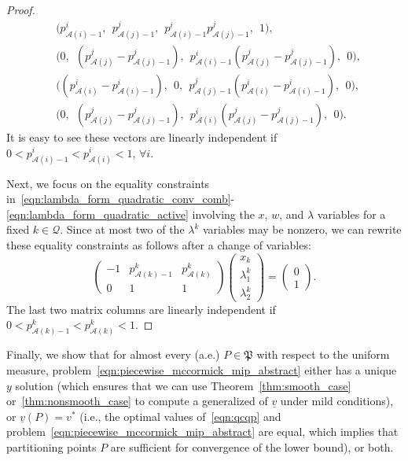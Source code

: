 \documentclass{article}
\begin{document}
\begin{proof}
\begin{align*}
&\bigl(p^i_{\mathcal{A}(i)-1}, \:\: p^j_{\mathcal{A}(j)-1}, \:\: p^i_{\mathcal{A}(i)-1} p^j_{\mathcal{A}(j)-1}, \:\: 1\bigr), \\ 
&\bigl(0, \:\: (p^j_{\mathcal{A}(j)} - p^j_{\mathcal{A}(j)-1}), \:\: p^i_{\mathcal{A}(i)-1} (p^j_{\mathcal{A}(j)} - p^j_{\mathcal{A}(j)-1}), \:\: 0\bigr), \\
&\bigl( (p^i_{\mathcal{A}(i)} - p^i_{\mathcal{A}(i)-1}), \:\: 0, \:\: p^j_{\mathcal{A}(j)-1} (p^i_{\mathcal{A}(i)} - p^i_{\mathcal{A}(i)-1}), \:\: 0\bigr), \\
& \bigl(0, \:\: (p^j_{\mathcal{A}(j)} - p^j_{\mathcal{A}(j)-1}), \:\: p^i_{\mathcal{A}(i)} (p^j_{\mathcal{A}(j)} - p^j_{\mathcal{A}(j)-1}), \:\: 0\bigr).
\end{align*}
It is easy to see these vectors are linearly independent if $0 < p^i_{\mathcal{A}(i)-1} < p^i_{\mathcal{A}(i)} < 1$, $\forall i$.

Next, we focus on the equality constraints in~\eqref{eqn:lambda_form_quadratic_conv_comb}-\eqref{eqn:lambda_form_quadratic_active} involving the $x$, $w$, and $\lambda$ variables for a fixed $k \in \mathcal{Q}$.
Since at most two of the $\lambda^{k}$ variables may be nonzero, we can rewrite these equality constraints as follows after a change of variables:
\[
\begin{pmatrix}
-1 & p^k_{\mathcal{A}(k)-1} & p^k_{\mathcal{A}(k)} \\
0 & 1 & 1
\end{pmatrix}
\begin{pmatrix}
x_k \\
\lambda^{k}_1 \\
\lambda^{k}_2
\end{pmatrix}
= \begin{pmatrix}
0 \\
1
\end{pmatrix}.
\]
The last two matrix columns are linearly independent if $0 < p^k_{\mathcal{A}(k)-1} < p^k_{\mathcal{A}(k)} < 1$.
\end{proof}


Finally, we show that for almost every (a.e.) $P \in \mathfrak{P}$ with respect to the uniform measure, problem~\eqref{eqn:piecewise_mccormick_mip_abstract} either has a unique $y$ solution (which ensures that we can use Theorem~\ref{thm:smooth_case} or~\ref{thm:nonsmooth_case} to compute a generalized of $\underline{v}$ under mild conditions), or $\underline{v}(P) = v^*$ (i.e., the optimal values of~\eqref{eqn:qcqp} and problem~\eqref{eqn:piecewise_mccormick_mip_abstract} are equal, which implies that partitioning points $P$ are sufficient for convergence of the lower bound), or both.
\end{document}
